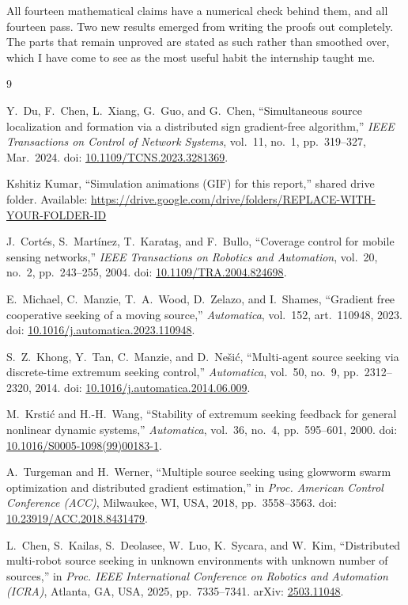 \documentclass[11pt,a4paper]{article}
\newcommand{\studentname}{Kshitiz Kumar}
\newcommand{\drivelink}{https://drive.google.com/drive/folders/REPLACE-WITH-YOUR-FOLDER-ID}
\begin{document}
All fourteen mathematical claims have a numerical check behind them, and all fourteen pass. Two new
results emerged from writing the proofs out completely. The parts that remain unproved are stated as
such rather than smoothed over, which I have come to see as the most useful habit the internship
taught me.

\begin{thebibliography}{9}

Y.~Du, F.~Chen, L.~Xiang, G.~Guo, and G.~Chen,
``Simultaneous source localization and formation via a distributed sign gradient-free algorithm,''
\emph{IEEE Transactions on Control of Network Systems}, vol.~11, no.~1, pp.~319--327, Mar.~2024.
doi: \href{https://doi.org/10.1109/TCNS.2023.3281369}{10.1109/TCNS.2023.3281369}.

\studentname, ``Simulation animations (GIF) for this report,'' shared drive folder.
Available: \expandafter\url\expandafter{\drivelink}

J.~Cort\'es, S.~Mart\'inez, T.~Karata\c{s}, and F.~Bullo,
``Coverage control for mobile sensing networks,''
\emph{IEEE Transactions on Robotics and Automation}, vol.~20, no.~2, pp.~243--255, 2004.
doi: \href{https://doi.org/10.1109/TRA.2004.824698}{10.1109/TRA.2004.824698}.

E.~Michael, C.~Manzie, T.~A.~Wood, D.~Zelazo, and I.~Shames,
``Gradient free cooperative seeking of a moving source,''
\emph{Automatica}, vol.~152, art.~110948, 2023.
doi: \href{https://doi.org/10.1016/j.automatica.2023.110948}{10.1016/j.automatica.2023.110948}.

S.~Z.~Khong, Y.~Tan, C.~Manzie, and D.~Ne\v{s}i{\'c},
``Multi-agent source seeking via discrete-time extremum seeking control,''
\emph{Automatica}, vol.~50, no.~9, pp.~2312--2320, 2014.
doi: \href{https://doi.org/10.1016/j.automatica.2014.06.009}{10.1016/j.automatica.2014.06.009}.

M.~Krsti{\'c} and H.-H.~Wang,
``Stability of extremum seeking feedback for general nonlinear dynamic systems,''
\emph{Automatica}, vol.~36, no.~4, pp.~595--601, 2000.
doi: \href{https://doi.org/10.1016/S0005-1098(99)00183-1}{10.1016/S0005-1098(99)00183-1}.

A.~Turgeman and H.~Werner,
``Multiple source seeking using glowworm swarm optimization and distributed gradient estimation,''
in \emph{Proc. American Control Conference (ACC)}, Milwaukee, WI, USA, 2018, pp.~3558--3563.
doi: \href{https://doi.org/10.23919/ACC.2018.8431479}{10.23919/ACC.2018.8431479}.

L.~Chen, S.~Kailas, S.~Deolasee, W.~Luo, K.~Sycara, and W.~Kim,
``Distributed multi-robot source seeking in unknown environments with unknown number of sources,''
in \emph{Proc. IEEE International Conference on Robotics and Automation (ICRA)}, Atlanta, GA, USA,
2025, pp.~7335--7341.
arXiv: \href{https://arxiv.org/abs/2503.11048}{2503.11048}.

\end{thebibliography}
\end{document}

